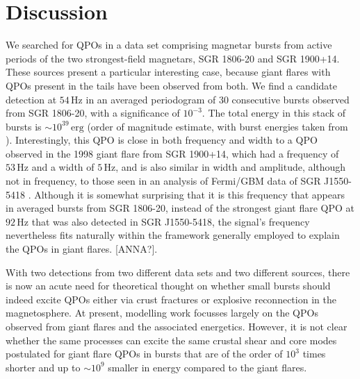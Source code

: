 \documentclass[numberedappendix]{emulateapj}
\newcommand{\hz}{\,\mathrm{Hz}}
\begin{document}
\section{Discussion}
\label{sec:discussion}

We searched for QPOs in a data set comprising magnetar bursts from active periods of the two strongest-field magnetars, SGR 1806-20 and SGR 1900+14. These sources present a particular interesting case, because giant flares with QPOs present in the tails have been observed from both.
We find a candidate detection at $54 \,\mathrm{Hz}$ in an averaged periodogram of 30 consecutive bursts observed from SGR 1806-20, with a significance of $10^{-3}$. The total energy in this stack of bursts is $\sim 10^{39} \, \mathrm{erg}$ (order of magnitude estimate, with burst energies taken from \citealt{gogus2000}). Interestingly, this QPO is close in both frequency and width to a QPO observed in the 1998 giant flare from SGR 1900+14, which had a frequency of $53\hz$ and a width of $5\hz$, and is also similar in width and amplitude, although not in frequency, to those seen in an analysis of Fermi/GBM data of SGR J1550-5418 \citep{huppenkothen2014}. Although it is somewhat surprising that it is this frequency that appears in averaged bursts from SGR 1806-20, instead of the strongest giant flare QPO at $92\,\mathrm{Hz}$ that was also detected in SGR J1550-5418, the signal's frequency nevertheless fits naturally within the framework generally employed to explain the QPOs in giant flares. [ANNA?]. 

With two detections from two different data sets and two different sources, there is now an acute need for theoretical thought on whether small bursts should indeed excite QPOs either via crust fractures or explosive reconnection in the magnetosphere. At present, modelling work focusses largely on the QPOs observed from giant flares and the associated energetics. However, it is not clear whether the same processes can excite the same crustal shear and core modes postulated for giant flare QPOs in bursts that are of the order of $10^3$ times shorter and up to $\sim 10^{9}$ smaller in energy compared to the giant flares.
\end{document}
